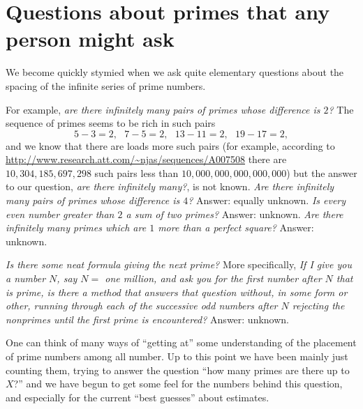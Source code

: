 \documentclass[11pt]{article}
\theoremstyle{plain}
\theoremstyle{definition}
\numberwithin{equation}{section}
\numberwithin{figure}{section}
\numberwithin{table}{section}
\begin{document}



\section{Questions about primes that any person might ask}

We become quickly stymied when we ask quite elementary questions about
the spacing of the infinite series of prime numbers.

\bigskip

For example, {\em are there infinitely many pairs of primes whose
  difference is $2$?}  The sequence of primes seems to be rich in such
pairs $$5-3 =2,\ \ \ 7-5=2,\ \ \ 13-11=2,\ \ \ 19-17 =2,$$ and we know
that there are loads more such pairs (for example, according to
\url{http://www.research.att.com/~njas/sequences/A007508} there are
$10,\!304,\!185,\!697,\!298$ such pairs less than
$10,\!000,\!000,\!000,\!000,\!000$) but the answer to our question,
{\em are there infinitely many?}, is not known. {\em Are there
  infinitely many pairs of primes whose difference is $4$?}  Answer:
equally unknown. {\em Is every even number greater than $2$ a sum of
  two primes?}  Answer: unknown. {\em Are there infinitely many primes
  which are $1$ more than a perfect square?}  Answer: unknown.

\bigskip


{\em Is there some neat formula giving the next prime?} More
specifically, {\em If I give you a number $N$, say $N=$ one million,
  and ask you for the first number after $N$ that is prime, is there a
  method that answers that question without, in some form or other,
  running through each of the successive odd numbers after $N$ rejecting
  the nonprimes until the first prime is encountered?}  Answer:
unknown.

\bigskip

One can think of many ways of ``getting at'' some understanding of the
placement of prime numbers among all number.  Up to this point we have
been mainly just counting them, trying to answer the question ``how
many primes are there up to $X$?''  and we have begun to get some feel
for the numbers behind this question, and especially for the current
``best guesses'' about estimates.
   
\end{document}
